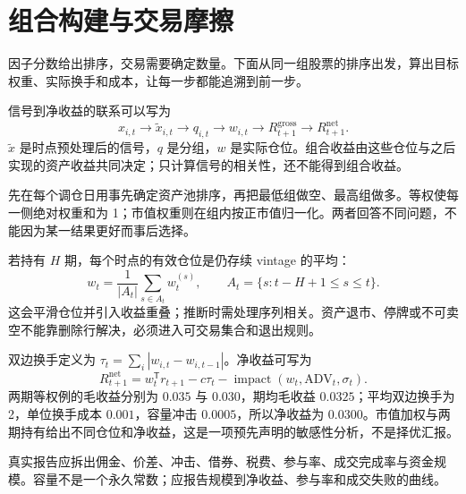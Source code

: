 \section{组合构建与交易摩擦}
\label{ch:lower-multifactor-research}

\begin{itemize}
  
\end{itemize}

因子分数给出排序，交易需要确定数量。下面从同一组股票的排序出发，算出目标权重、实际换手和成本，让每一步都能追溯到前一步。



信号到净收益的联系可以写为
\[
x_{i,t}\longrightarrow \tilde x_{i,t}\longrightarrow q_{i,t}
\longrightarrow w_{i,t}\longrightarrow R^{\mathrm{gross}}_{t+1}
\longrightarrow R^{\mathrm{net}}_{t+1}.
\]
$\tilde x$ 是时点预处理后的信号，$q$ 是分组，$w$ 是实际仓位。组合收益由这些仓位与之后实现的资产收益共同决定；只计算信号的相关性，还不能得到组合收益。




先在每个调仓日用事先确定资产池排序，再把最低组做空、最高组做多。等权使每一侧绝对权重和为 1；市值权重则在组内按正市值归一化。两者回答不同问题，不能因为某一结果更好而事后选择。

若持有 $H$ 期，每个时点的有效仓位是仍存续 vintage 的平均：
\[
w_t=\frac1{|A_t|}\sum_{s\in A_t}w_t^{(s)},
\qquad A_t=\{s:t-H+1\le s\le t\}.
\]
这会平滑仓位并引入收益重叠；推断时需处理序列相关。资产退市、停牌或不可卖空不能靠删除行解决，必须进入可交易集合和退出规则。


双边换手定义为 $\tau_t=\sum_i|w_{i,t}-w_{i,t-1}|$。净收益可写为
\[
R^{\mathrm{net}}_{t+1}=w_t^{\mathsf T}r_{t+1}
-c\tau_t-\operatorname{impact}(w_t,\mathrm{ADV}_t,\sigma_t).
\]
两期等权例的毛收益分别为 $0.035$ 与 $0.030$，期均毛收益 $0.0325$；平均双边换手为 2，单位换手成本 $0.001$，容量冲击 $0.0005$，所以净收益为 $0.0300$。市值加权与两期持有给出不同仓位和净收益，这是一项预先声明的敏感性分析，不是择优汇报。



真实报告应拆出佣金、价差、冲击、借券、税费、参与率、成交完成率与资金规模。容量不是一个永久常数；应报告规模到净收益、参与率和成交失败的曲线。

